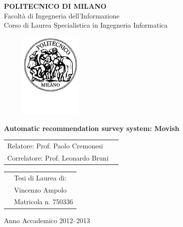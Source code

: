 \documentclass[a4paper]{report}
\begin{document}
\begin{titlepage}

\begin{center}
\LARGE
\textbf{POLITECNICO DI MILANO} \\
\Large
Facolt\`a di Ingegneria dell'Informazione \\
Corso di Laurea Specialistica in Ingegneria Informatica
\end{center}

\addvspace{1.5cm}
\begin{figure}[h]
\begin{center}
\includegraphics[width=3cm]{figures/PoliMi}
\end{center}
\end{figure}

\addvspace{0.75cm}
\begin{center}
\LARGE
\textbf{Automatic recommendation survey system: Movish}
\end{center}

\addvspace{4cm}
\Large
\begin{center}
\begin{tabular}{p{}p{}}
Relatore: Prof. Paolo Cremonesi & \\
Correlatore: Prof. Leonardo Bruni & \\
\end{tabular}
\end{center}

\addvspace{2cm}
\Large
\begin{center}
\begin{tabular}{p{}p{}}
& Tesi di Laurea di: \\
& Vincenzo Ampolo \\
& Matricola n. 750336
\end{tabular}
\end{center}

\vfill
\Large
\begin{center}
Anno Accademico 2012--2013
\end{center}

\end{titlepage}
\end{document}
